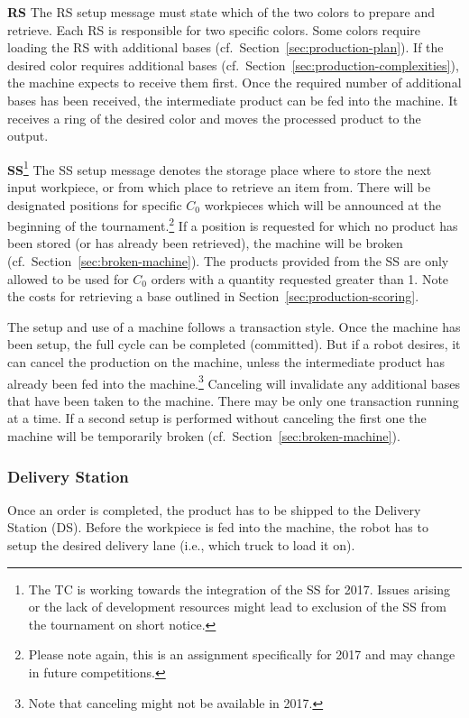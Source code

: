 \documentclass[12pt,twoside]{article}
\newcommand{\refsec}[1]{Section~\ref{#1}}
\begin{document}
\noindent\textbf{RS}
The RS setup message must state which of the two colors to prepare and
retrieve. Each RS is responsible for two specific colors. Some colors
require loading the RS with additional bases
(cf.~\refsec{sec:production-plan}). If the desired color requires
additional bases (cf.~\refsec{sec:production-complexities}), the
machine expects to receive them first. Once the required number of
additional bases has been received, the intermediate product can be
fed into the machine. It receives a ring of the desired color and
moves the processed product to the output.

\noindent\textbf{SS}\footnote{The TC is working towards the
  integration of the SS for 2017. Issues arising or the lack of
  development resources might lead to exclusion of the SS from the
  tournament on short notice.}
%
The SS setup message denotes the storage place where to store the next
input workpiece, or from which place to retrieve an item from. There
will be designated positions for specific $C_0$ workpieces which will
be announced at the beginning of the tournament.\footnote{Please note
  again, this is an assignment specifically for 2017 and may change in
  future competitions.} If a position is requested for which no
product has been stored (or has already been retrieved), the machine
will be broken (cf.~\refsec{sec:broken-machine}). The products
provided from the SS are only allowed to be used for $C_0$ orders with
a quantity requested greater than 1. Note the costs for retrieving a
base outlined in \refsec{sec:production-scoring}.


\medskip
The setup and use of a machine follows a transaction style. Once the
machine has been setup, the full cycle can be completed (committed).
But if a robot desires, it can cancel the production on the machine,
unless the intermediate product has already been fed into the
machine.\footnote{Note that canceling might not be available in 2017.}
Canceling will invalidate any additional bases that have been taken to
the machine. There may be only one transaction running at a time. If a
second setup is performed without canceling the first one the machine will
be temporarily broken (cf.~\refsec{sec:broken-machine}).

\subsubsection{Delivery Station} 
\label{sec:delivery-station}
Once an order is completed, the product has to be shipped to the
Delivery Station (DS). Before the workpiece is fed into the machine,
the robot has to setup the desired delivery lane (i.e., which truck to
load it on).
\end{document}
